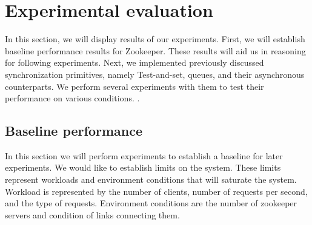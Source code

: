 \section{Experimental evaluation}\label{sec:eval}
In this section, we will display results of our experiments. First, we will establish baseline performance results for Zookeeper. These results will aid us in reasoning for following experiments. Next, we implemented previously discussed synchronization primitives, namely Test-and-set, queues, and their asynchronous counterparts. We perform several experiments with them to test their performance on various conditions. .






\subsection{Baseline performance}
 In this section we will perform experiments to establish a baseline for later experiments. We would like to establish limits on the system. These limits represent workloads and environment conditions that will saturate the system. Workload is represented by the number of clients, number of requests per second, and the type of requests. Environment conditions are the number of zookeeper servers and condition of links connecting them.

